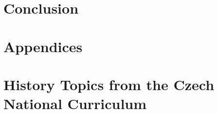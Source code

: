 \documentclass[]{interact}
\theoremstyle{plain}%
\theoremstyle{definition}
\theoremstyle{remark}
\begin{document}
\section{Conclusion}








\section{Appendices}

\appendix

\section{History Topics from the Czech National Curriculum}
\label{appendix:national-curriculum-topics}
\end{document}
